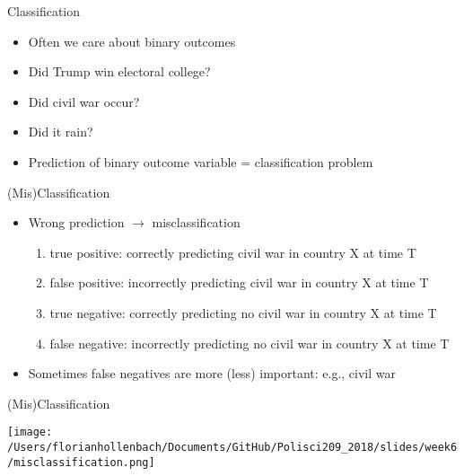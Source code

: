 \documentclass[presentation]{beamer}
\begin{document}
\begin{frame}[label={sec:orgf9e1cf3}]{Classification}
\begin{itemize}
\item Often we care about binary outcomes
\item Did Trump win electoral college?
\item Did civil war occur?
\item Did it rain?

\item \alert{Prediction of binary outcome variable = classification problem}
\end{itemize}
\end{frame}


\begin{frame}[label={sec:org5a7207f}]{(Mis)Classification}
\begin{itemize}
\item Wrong prediction \(\rightarrow\) misclassification
\begin{enumerate}
\item true positive: correctly predicting civil war in country X at time T
\item false positive: incorrectly predicting civil war in country X at time T
\item true negative: correctly predicting \alert{no} civil war in country X at time T
\item false negative: incorrectly predicting \alert{no} civil war in country X at time T
\end{enumerate}

\item Sometimes false negatives are more (less) important: e.g., civil war
\end{itemize}
\end{frame}


\begin{frame}[label={sec:orgc0f7797}]{(Mis)Classification}
\begin{center}
\texttt{[image: /Users/florianhollenbach/Documents/GitHub/Polisci209\_2018/slides/week6/misclassification.png]}
\end{center}
\end{frame}
\end{document}
